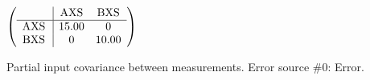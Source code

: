 \begin{table}[H]
\scriptsize
\begin{center}
\renewcommand{\arraystretch}{1.1}
\begin{math}\left(\begin{array}{c|cc}
 & \mathrm{AXS} & 
\mathrm{BXS} \\
\hline
\mathrm{AXS} \hspace*{2pt} &      15.00 &  0 \\
\mathrm{BXS} \hspace*{2pt} &  0 &      10.00 \\
\end{array}\right)\end{math}
\caption{Partial input covariance between measurements. Error source \#0: Error.}
\renewcommand{\arraystretch}{1}
\end{center}
\end{table}
\clearpage
